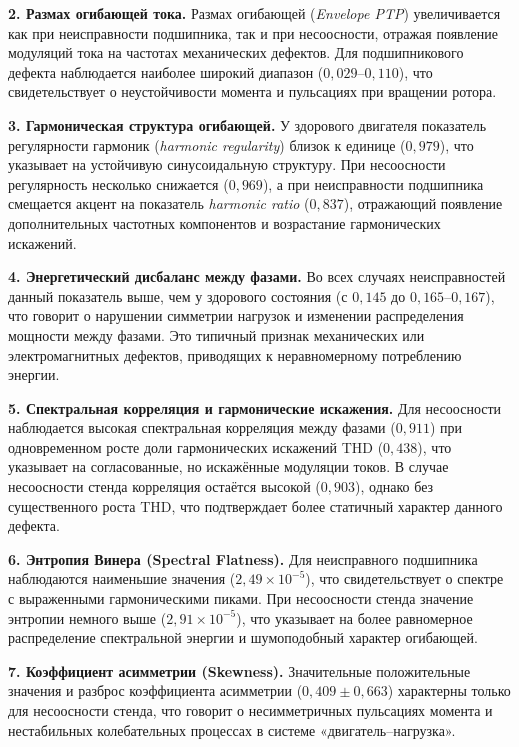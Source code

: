 \textbf{2. Размах огибающей тока.}
Размах огибающей (\textit{Envelope PTP}) увеличивается как при неисправности подшипника, так и при несоосности, отражая появление модуляций тока на частотах механических дефектов. 
Для подшипникового дефекта наблюдается наиболее широкий диапазон ($0{,}029$–$0{,}110$), что свидетельствует о неустойчивости момента и пульсациях при вращении ротора.

\textbf{3. Гармоническая структура огибающей.}
У здорового двигателя показатель регулярности гармоник (\textit{harmonic regularity}) близок к единице ($0{,}979$), что указывает на устойчивую синусоидальную структуру. 
При несоосности регулярность несколько снижается ($0{,}969$), а при неисправности подшипника смещается акцент на показатель \textit{harmonic ratio} ($0{,}837$), отражающий появление дополнительных частотных компонентов и возрастание гармонических искажений.

\textbf{4. Энергетический дисбаланс между фазами.}
Во всех случаях неисправностей данный показатель выше, чем у здорового состояния (с $0{,}145$ до $0{,}165$–$0{,}167$), что говорит о нарушении симметрии нагрузок и изменении распределения мощности между фазами. 
Это типичный признак механических или электромагнитных дефектов, приводящих к неравномерному потреблению энергии.

\textbf{5. Спектральная корреляция и гармонические искажения.}
Для несоосности наблюдается высокая спектральная корреляция между фазами ($0{,}911$) при одновременном росте доли гармонических искажений THD ($0{,}438$), что указывает на согласованные, но искажённые модуляции токов. 
В случае несоосности стенда корреляция остаётся высокой ($0{,}903$), однако без существенного роста THD, что подтверждает более статичный характер данного дефекта.

\textbf{6. Энтропия Винера (Spectral Flatness).}
Для неисправного подшипника наблюдаются наименьшие значения ($2{,}49\times10^{-5}$), что свидетельствует о спектре с выраженными гармоническими пиками. 
При несоосности стенда значение энтропии немного выше ($2{,}91\times10^{-5}$), что указывает на более равномерное распределение спектральной энергии и шумоподобный характер огибающей.

\textbf{7. Коэффициент асимметрии (Skewness).}
Значительные положительные значения и разброс коэффициента асимметрии ($0{,}409 \pm 0{,}663$) характерны только для несоосности стенда, что говорит о несимметричных пульсациях момента и нестабильных колебательных процессах в системе «двигатель–нагрузка».

